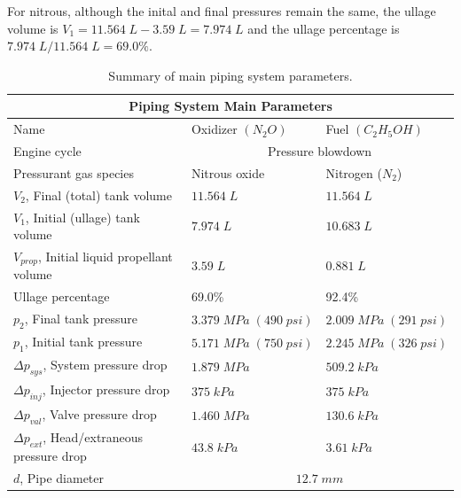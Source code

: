 \documentclass[9pt]{article} %
\numberwithin{equation}{section} %
\begin{document}
For nitrous, although the inital and final pressures remain the same, the ullage volume is $V_{1} = 11.564 \; L - 3.59 \; L = 7.974 \; L$ and the ullage percentage is $7.974 \; L/11.564 \; L = 69.0 \%$.

\begin{table}[!htb]
\centering
\begin{tabular}{ |p{6cm}||p{3.25cm}|p{3.25cm}| }
\hline
\multicolumn{3}{|c|}{Piping System Main Parameters} \\
\hline
Name & Oxidizer $(N_{2}O)$ & Fuel $(C_{2}H_{5}OH)$ \\ 
\hline
Engine cycle & \multicolumn{2}{|c|}{Pressure blowdown}  \\
\hline
Pressurant gas species & Nitrous oxide & Nitrogen ($N_{2}$) \\
$V_{2}$, Final (total) tank volume & $11.564 \; L $ & $11.564 \; L$ \\
$V_{1}$, Initial (ullage) tank volume & $7.974 \; L $ & $10.683 \; L$ \\
$V_{prop}$, Initial liquid propellant volume & $3.59 \; L$ & $0.881 \; L$ \\ 
Ullage percentage & 69.0\% & 92.4\% \\
$p_{2}$, Final tank pressure & $3.379 \; MPa \; (490 \; psi)$ & $2.009 \; MPa \; (291 \; psi)$ \\
$p_{1}$, Initial tank pressure & $5.171 \; MPa \; (750 \; psi)$ & $2.245 \; MPa \; (326 \; psi)$ \\
$\Delta p_{sys}$, System pressure drop & $1.879 \; MPa$ & $509.2 \; kPa$ \\
$\Delta p_{inj}$, Injector pressure drop & $375 \; kPa$ & $375 \; kPa$ \\
$\Delta p_{val}$, Valve pressure drop & $1.460 \; MPa$ & $130.6 \; kPa$ \\
$\Delta p_{ext}$, Head/extraneous pressure drop & $43.8 \; kPa$ & $3.61 \; kPa$ \\
\hline
$d$, Pipe diameter & \multicolumn{2}{|c|}{$12.7 \; mm$}  \\
\hline
\end{tabular}
\caption[]{Summary of main piping system parameters.\protect\footnotemark}
\label{table:piping_system_final_parameters}
\end{table}
\end{document}
